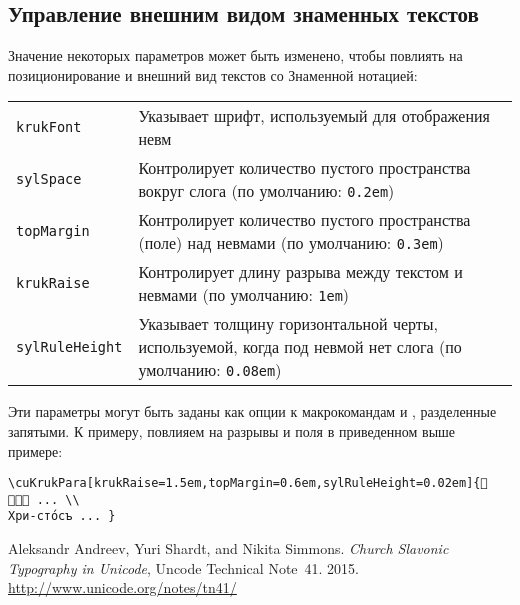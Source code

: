 \begin{RU}
\subsection{Управление внешним видом знаменных текстов}

Значение некоторых параметров может быть изменено, чтобы повлиять на позиционирование и внешний вид текстов со Знаменной нотацией:

\begin{center}
\begin{tabular}{lp{3.5in}}
\hline
\verb+krukFont+ & Указывает шрифт, используемый для отображения невм \\
\verb+sylSpace+ & Контролирует количество пустого пространства вокруг слога (по умолчанию: \verb+0.2em+) \\
\verb+topMargin+ & Контролирует количество пустого пространства (поле) над невмами (по умолчанию: \verb+0.3em+) \\
\verb+krukRaise+ & Контролирует длину разрыва между текстом и невмами (по умолчанию: \verb+1em+) \\
\verb+sylRuleHeight+ & Указывает толщину горизонтальной черты, используемой, когда под невмой нет слога (по умолчанию: \verb+0.08em+) \\
\hline
\end{tabular}
\end{center}

\noindent Эти параметры могут быть заданы как опции к макрокомандам  и , разделенные запятыми. К примеру, повлияем на разрывы и поля в приведенном выше примере:
\end{RU}

\begin{verbatim}
\cuKrukPara[krukRaise=1.5em,topMargin=0.6em,sylRuleHeight=0.02em]{𜽟 𜾆𜼱𜼇 ... \\
Хри-сто́съ ... }
\end{verbatim}

\medskip

\begin{churchslavonic}
\noindent
{}
\end{churchslavonic}

\begin{thebibliography}{9}

  Aleksandr Andreev, Yuri Shardt, and Nikita Simmons.
  \emph{Church Slavonic Typography in Unicode},
  Uncode Technical Note~41. 2015.
  \url{http://www.unicode.org/notes/tn41/}

\end{thebibliography}


